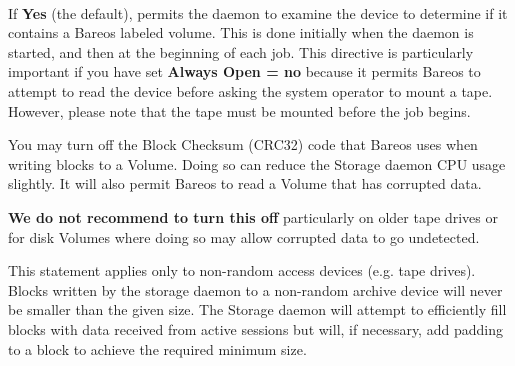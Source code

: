 \begin{description}



\item [Automatic Mount = {\textless}yes{\textbar}no{\textgreater}] \hfill \\
If {\bf Yes} (the default), permits the daemon to examine the device to
determine if it contains a Bareos labeled volume.  This is done
initially when the daemon is started, and then at the beginning of each
job.  This directive is particularly important if you have set
{\bf Always Open = no} because it permits Bareos to attempt to read the
device before asking the system operator to mount a tape.  However,
please note that the tape must be mounted before the job begins.


You may turn off the Block Checksum (CRC32) code that Bareos uses when
writing blocks to a Volume. Doing so can reduce the Storage daemon CPU usage
slightly.  It will also permit Bareos to read a Volume that has corrupted
data.

\textbf{We do not recommend to turn this off} particularly on older tape
drives or for disk Volumes where doing so may allow corrupted data to go
undetected.

%
\label{storage-device-minimumblocksize}%
This statement applies only to non-random access devices (e.g.
tape drives).  Blocks written by the storage daemon to a non-random
archive device will never be smaller than the given size.
The Storage daemon will attempt to efficiently fill blocks with data
received from active sessions but will, if necessary, add padding to a
block to achieve the required minimum size.


\end{description}
